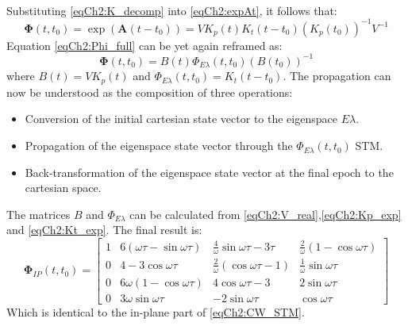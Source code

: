 		\paragraph{  \\}
		\indent Substituting \eqref{eqCh2:K_decomp} into \eqref{eqCh2:expAt}, it follows that:
		\begin{equation}
		\bm \Phi(t, t_0) = \exp \left(\bm A (t - t_0)\right) = V K_p(t) K_t(t - t_0) \left(K_p(t_0)\right)^{-1} V^{-1}
		\label{eqCh2:Phi_full}
		\end{equation}
		\indent Equation \eqref{eqCh2:Phi_full} can be yet again reframed as:
		\begin{equation}
		\bm \Phi(t, t_0) = B(t) \Phi_{E\lambda} (t, t_0) \left(B(t_0)\right)^{-1}
		\label{eqCh2:Phi_full_V2}
		\end{equation}
		\noindent where $B(t) = V K_p(t)$ and $\Phi_{E\lambda} (t, t_0) = K_t(t - t_0)$. The propagation can now be understood as the composition of three operations:
		\begin{itemize}
		\item[ \GMVred{\nth{1}}] Conversion of the initial cartesian state vector to the eigenspace $E\lambda$.
		\item[ \GMVred{\nth{2}}] Propagation of the eigenspace state vector through the $\Phi_{E\lambda} (t, t_0)$ STM.
		\item[ \GMVred{\nth{3}}] Back-transformation of the eigenspace state vector at the final epoch to the cartesian space.
		\end{itemize}
		\indent The matrices $B$ and $\Phi_{E\lambda}$ can be calculated from \eqref{eqCh2:V_real},\eqref{eqCh2:Kp_exp} and \eqref{eqCh2:Kt_exp}. The final result is:
		\begin{equation}
		\bm \Phi_{IP} (t, t_0) = \left[
		\begin{array}{cccc}
		1	& 6(\omega\tau - \sin\omega\tau)	& \frac{4}{\omega} \sin\omega\tau - 3\tau	& \frac{2}{\omega} (1 - \cos\omega\tau) \\
		0	& 4 - 3 \cos\omega\tau				& \frac{2}{\omega} (\cos\omega\tau - 1)		& \frac{1}{\omega} \sin\omega\tau\\
		0	& 6\omega (1 - \cos\omega\tau)		& 4\cos\omega\tau - 3						& 2\sin\omega\tau	\\
		0	& 3\omega\sin\omega\tau 			& -2 \sin\omega\tau							& \cos\omega\tau
		\end{array}\right]
		\label{eqCh2:phi_IP}
		\end{equation}
		\indent Which is identical to the in-plane part of \eqref{eqCh2:CW_STM}.
